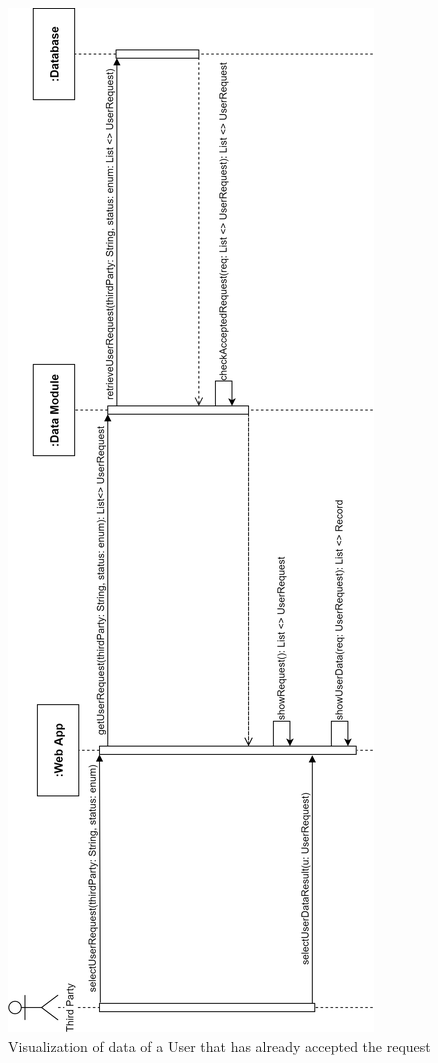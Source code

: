 \begin{figure}[H]

    \centering
    \includegraphics[scale=0.17]{./Pictures/showDataResultV.png}
    \caption{Visualization of data of a User that has already accepted the request}

\end{figure}

